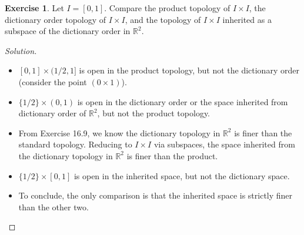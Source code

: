 \documentclass{article}
\theoremstyle{definition}
\newtheorem{exercise}{Exercise}[section]
\begin{document}
\begin{exercise}
  Let $I = [0,1]$. Compare the product topology of $I\times I$, the dictionary order topology of $I\times I$, and the topology of $I\times I$ inherited as a subspace of the dictionary order in $\mathbb{R}^2$.
\end{exercise}
\begin{proof}[Solution]
  \begin{itemize}
    \item $[0,1]\times(1/2,1]$ is open in the product topology, but not the dictionary order (consider the point $(0\times 1)$).
    \item $\{1/2\}\times (0,1)$ is open in the dictionary order or the space inherited from dictionary order of $\mathbb{R}^2$, but not the product topology.
    \item From Exercise 16.9, we know the dictionary topology in $\mathbb{R}^2$ is finer than the standard topology. Reducing to $I\times I$ via subspaces, the space inherited from the dictionary topology in $\mathbb{R}^2$ is finer than the product.
    \item $\{1/2\}\times[0,1]$ is open in the inherited space, but not the dictionary space.
    \item To conclude, the only comparison is that the inherited space is strictly finer than the other two.
  \end{itemize}
\end{proof}
\end{document}
